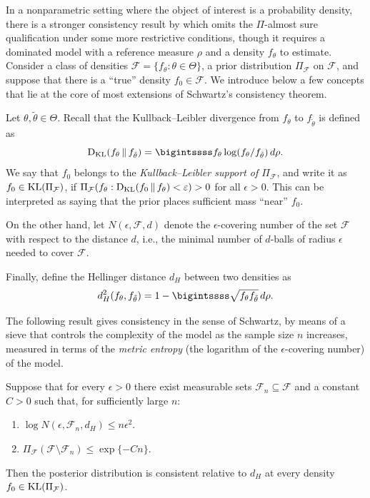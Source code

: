 In a nonparametric setting where the object of interest is a probability density, there is a stronger consistency result by \citet{schwartz1965bayes} which omits the \(\Pi\)-almost sure qualification under some more restrictive conditions, though it requires a dominated model with a reference measure \(\rho\) and a density \(f_\theta\) to estimate. Consider a class of densities \(\mathcal F=\{f_\theta: \theta\in\Theta\}\), a prior distribution \(\Pi_{\mathcal F}\) on \(\mathcal F\), and suppose that there is a ``true'' density \(f_0\in\mathcal F\). We introduce below a few concepts that lie at the core of most extensions of Schwartz's consistency theorem. 

Let \(\theta, \tilde\theta \in \Theta\). Recall that the Kullback--Leibler divergence from \(f_\theta\) to \(f_{\tilde\theta}\) is defined as 
\[
  \dkl(f_\theta \,\|\, f_{\tilde\theta}) = \bigintssss f_\theta \log (f_\theta/f_{\tilde\theta})\, d\rho.
\] 
We say that \(f_0\) belongs to the \textit{Kullback--Leibler support of \(\Pi_{\mathcal F}\)}, and write it as \(f_0 \in \operatorname{KL}(\Pi_{\mathcal F})\), if \(\Pi_{\mathcal F}(f_\theta: \operatorname{D_{KL}}(f_0 \,\|\, f_\theta) < \varepsilon) > 0\) for all \(\epsilon > 0\). This can be interpreted as saying that the prior places sufficient mass ``near'' \(f_0\).

On the other hand, let \(N(\epsilon, \mathcal F, d)\) denote the \(\epsilon\)-covering number of the set \(\mathcal F\) with respect to the distance \(d\), i.e., the minimal number of \(d\)-balls of radius \(\epsilon\) needed to cover \(\mathcal F\). 

Finally, define the Hellinger distance \(d_H\) between two densities as
\[
  d^2_H(f_\theta, f_{\tilde\theta}) = 1 - \bigintssss \sqrt{f_\theta f_{\tilde\theta}}\, d\rho.
\] 

The following result gives consistency in the sense of Schwartz, by means of a sieve that controls the complexity of the model as the sample size \(n\) increases, measured in terms of the \textit{metric entropy} (the logarithm of the \(\epsilon\)-covering number) of the model.

\begin{theorem}\label{th:consistency-hellinger}
  Suppose that for every \(\epsilon > 0\) there exist measurable sets \(\mathcal F_n \subseteq \mathcal F\) and a constant \(C>0\) such that, for sufficiently large \(n\): 
  \begin{enumerate}[label=(\roman*)]
    \item \(\log N(\epsilon, \mathcal F_n, d_H) \leq n\epsilon^2\).
    \item \(\Pi_{\mathcal F}(\mathcal F \setminus \mathcal F_n) \leq \exp\{-Cn\}\).
  \end{enumerate}
  Then the posterior distribution is consistent relative to \(d_H\) at every density \(f_0\in \operatorname{KL}(\Pi_{\mathcal F})\).
\end{theorem}

